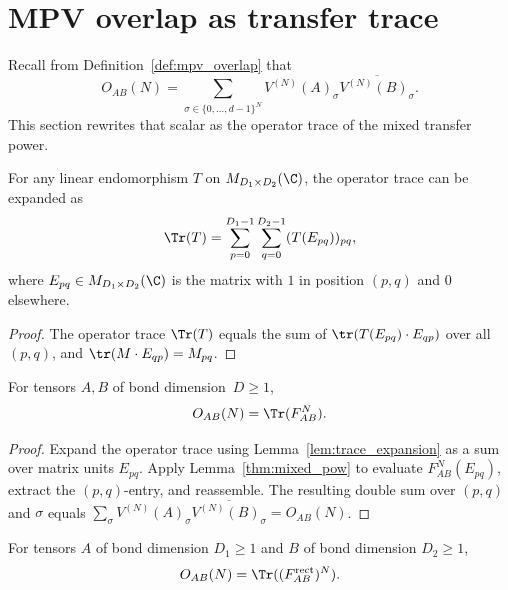 \section{MPV overlap as transfer trace}

Recall from Definition~\ref{def:mpv_overlap} that
\[
    O_{AB}(N) = \sum_{\sigma \in \{0,\ldots,d{-}1\}^N}
    V^{(N)}(A)_\sigma \overline{V^{(N)}(B)_\sigma}.
\]
This section rewrites that scalar as the operator trace of the
mixed transfer power.

\begin{lemma}\label{lem:trace_expansion}
    \leanok
    For any linear endomorphism $T$ on $M_{D_1 \times D_2}(\C)$,
    the operator trace can be expanded as
    \[
        \Tr(T)
        =
        \sum_{p=0}^{D_1-1} \sum_{q=0}^{D_2-1}
        (T(E_{pq}))_{pq},
    \]
    where $E_{pq} \in M_{D_1 \times D_2}(\C)$ is the matrix with
    $1$ in position $(p,q)$ and $0$ elsewhere.
\end{lemma}

\begin{proof}\leanok
    The operator trace $\Tr(T)$ equals the sum of
    $\tr(T(E_{pq}) \cdot E_{qp})$ over all $(p,q)$,
    and $\tr(M \cdot E_{qp}) = M_{pq}$.
\end{proof}

\begin{lemma}\label{thm:overlap_trace}
    \leanok
    For tensors $A, B$ of bond dimension~$D \ge 1$,
    \[
        O_{AB}(N)
        =
        \Tr(F_{AB}^N).
    \]
\end{lemma}

\begin{proof}
    \leanok
    Expand the operator trace using
    Lemma~\ref{lem:trace_expansion} as a sum over matrix units
    $E_{pq}$.
    Apply Lemma~\ref{thm:mixed_pow} to evaluate
    $F_{AB}^N(E_{pq})$, extract the $(p,q)$-entry, and
    reassemble. The resulting double sum over $(p,q)$ and $\sigma$
    equals $\sum_\sigma V^{(N)}(A)_\sigma
        \overline{V^{(N)}(B)_\sigma} = O_{AB}(N)$.
\end{proof}

\begin{lemma}\label{thm:overlap_trace_rect}
    \leanok
    For tensors $A$ of bond dimension $D_1 \ge 1$ and $B$ of bond
    dimension $D_2 \ge 1$,
    \[
        O_{AB}(N) = \Tr((F_{AB}^{\mathrm{rect}})^N).
    \]
\end{lemma}

